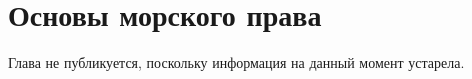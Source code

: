 \chapter{Основы морского права}

Глава не публикуется, поскольку информация на данный момент устарела.

